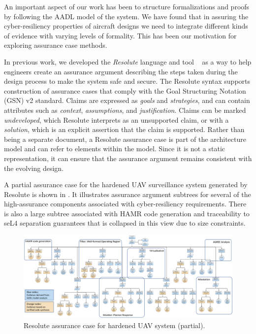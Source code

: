 An important aspect of our work has been to structure formalizations and proofs by following
the AADL model of the system. 
We have found that in assuring the cyber-resiliency properties of aircraft designs we need to integrate
different kinds of evidence with varying levels of formality. This has been our motivation
for exploring assurance case methods.

In previous work, we developed the {\em Resolute} language and tool
~\cite{resolute-destion} as a way to help engineers create an assurance
argument describing the steps taken during the design process to make the system safe and secure.
The Resolute syntax supports construction of assurance cases that comply with the Goal Structuring
Notation (GSN) v2 standard.
Claims are expressed as \textit{goals} and
\textit{strategies}, and can contain attributes such as \textit{context}, \textit{assumptions}, and
\textit{justification}. Claims can be marked \textit{undeveloped}, which Resolute interprets as an
unsupported claim, or with a \textit{solution}, which is an explicit assertion that the claim is
supported. Rather than being a separate document, a Resolute assurance case is part of the
architecture model and can refer to elements within the model. Since it is not a static
representation, it can ensure that the assurance argument remains consistent with the evolving
design.  

A partial assurance case for the hardened UAV surveillance system generated by Resolute 
is shown in .  It illustrates assurance argument subtrees for several of
the high-assurance components associated with cyber-resiliency requirements.  There is also a large subtree associated
with HAMR code generation and traceability to seL4 separation guarantees that
is collapsed in this view due to size constraints.

\begin{figure} 
\centering 
\includegraphics[width=\textwidth]{figs/assurance-case.png}
\caption{Resolute assurance case for hardened UAV system (partial).}
\label{fig:assurance-case} 
\end{figure}

